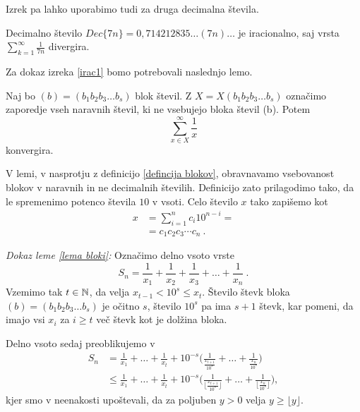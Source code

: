 \documentclass[twoside,11pt]{article}
\begin{document}
Izrek pa lahko uporabimo tudi za druga decimalna števila.

\begin{zgled}
    Decimalno število $Dec\{7n\} = 0,714212835\dots (7n) \dots$ je iracionalno, saj
    vrsta $\sum_{k=1}^{\infty}\frac{1}{7n} $ divergira.
\end{zgled}

Za dokaz izreka \ref{irac1} bomo potrebovali naslednjo lemo.

\begin{lema}\label{lema bloki}
    Naj bo $(b) = (b_1b_2b_3 \dots b_s)$ blok števil. Z $X = X(b_1b_2b_3 \dots b_s)$ označimo
    zaporedje vseh naravnih števil, ki ne vsebujejo bloka števil (b). Potem 
    \[ \sum_{x \in X}^{\infty} \frac{1}{x}\] konvergira.
\end{lema}

\begin{opomba}
    V lemi, v nasprotju z definicijo \ref{defincija blokov}, obravnavamo vsebovanost blokov v naravnih
    in ne decimalnih številih. Definicijo zato prilagodimo tako, da le spremenimo potenco števila
    $10$ v vsoti. Celo število $x$ tako zapišemo kot 
    \[ 
        \begin{split}
            x & = \sum^n_{i=1} c_i 10^{n-i} = \\
            & = c_1c_2c_3 \cdots c_n \ .
        \end{split} \]
\end{opomba}

\noindent
{\em Dokaz leme \ref{lema bloki}:\/} 
Označimo delno vsoto vrste 
\[ S_n = \frac{1}{x_1} + \frac{1}{x_2} + \frac{1}{x_3} + \dots + \frac{1}{x_n} \ . \]
Vzemimo tak $t \in \mathbb{N} $, da velja $x_{t-1} < 10^s \leq x_t$. Število števk bloka $(b) = (b_1b_2b_3 \dots b_s)$
je očitno $s$, število $10^s$ pa ima $s+1$ števk, kar pomeni, da imajo vsi $x_i$ za $i \geq t$
več števk kot je dolžina bloka. 

Delno vsoto sedaj preoblikujemo v
\[ 
    \begin{split}
        S_n &= \frac{1}{x_1} + \dots + \frac{1}{x_t} + 10^{-s}\bigg(\frac{1}{\frac{x_{t + 1}}{10^s}} + \dots + \frac{1}{\frac{x_n}{10^s}}\bigg) \\
        &\leq \frac{1}{x_1} + \dots + \frac{1}{x_t} + 10^{-s}\bigg(\frac{1}{ \lfloor\frac{x_{t + 1}}{10^s}\rfloor} + \dots + \frac{1}{\lfloor\frac{x_n}{10^s}\rfloor}\bigg) ,
    \end{split}
     \]
kjer smo v neenakosti upoštevali, da za poljuben $y > 0$ velja $y \geq \lfloor y \rfloor$.
\end{document}
